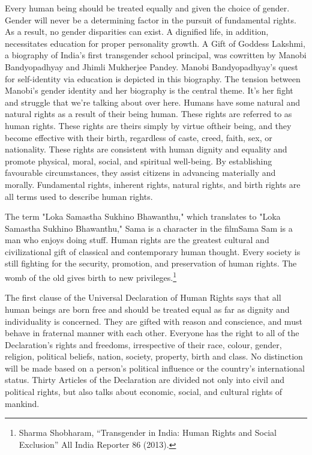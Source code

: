 \begin{multicols}{2}


\noi
Every human being should be treated equally and given the choice of gender. Gender will never
be a determining factor in the pursuit of fundamental rights. As a result, no gender disparities
can exist. A dignified life, in addition, necessitates education for proper personality growth. A
Gift of Goddess Lakshmi, a biography of India's first transgender school principal, was cowritten by Manobi Bandyopadhyay and Jhimli Mukherjee Pandey. Manobi Bandyopadhyay's
quest for self-identity via education is depicted in this biography. The tension between
Manobi's gender identity and her biography is the central theme. It's her fight and struggle that
we're talking about over here. Humans have some natural and natural rights as a result of their
being human. These rights are referred to as human rights. These rights are theirs simply by
virtue oftheir being, and they become effective with their birth, regardless of caste, creed, faith,
sex, or nationality. These rights are consistent with human dignity and equality and promote
physical, moral, social, and spiritual well-being. By establishing favourable circumstances,
they assist citizens in advancing materially and morally. Fundamental rights, inherent rights,
natural rights, and birth rights are all terms used to describe human rights.

\noi
The term "Loka Samastha Sukhino Bhawanthu," which translates to "Loka Samastha Sukhino
Bhawanthu," Sama is a character in the filmSama Sam is a man who enjoys doing stuff. Human
rights are the greatest cultural and civilizational gift of classical and contemporary human
thought. Every society is still fighting for the security, promotion, and preservation of human
rights. The womb of the old gives birth to new privileges.\footnote{Sharma Shobharam, “Transgender in India: Human Rights and Social Exclusion” All India Reporter 86 (2013).}

\noi
The first clause of the Universal Declaration of Human Rights says that all human beings are
born free and should be treated equal as far as dignity and individuality is concerned. They are
gifted with reason and conscience, and must behave in fraternal manner with each other.
Everyone has the right to all of the Declaration's rights and freedoms, irrespective of their race,
colour, gender, religion, political beliefs, nation, society, property, birth and class. No
distinction will be made based on a person's political influence or the country's international
status. Thirty Articles of the Declaration are divided not only into civil and political rights, but
also talks about economic, social, and cultural rights of mankind.


\end{multicols}
